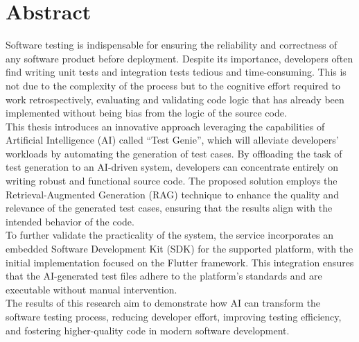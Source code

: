 \documentclass[12pt, twoside]{report}
\begin{document}
\tableofcontents
\listoftables
{}
\listoffigures
{}
\listofalgorithms
{}
\lstlistoflistings
{}

\chapter*{Abstract}
Software testing is indispensable for ensuring the reliability and correctness of any software product before deployment. Despite its importance, developers often find writing unit tests and integration tests tedious and time-consuming. This is not due to the complexity of the process but to the cognitive effort required to work retrospectively, evaluating and validating code logic that has already been implemented without being bias from the logic of the source code. \\
This thesis introduces an innovative approach leveraging the capabilities of Artificial Intelligence (AI) called “Test Genie”, which will alleviate developers' workloads by automating the generation of test cases. By offloading the task of test generation to an AI-driven system, developers can concentrate entirely on writing robust and functional source code. The proposed solution employs the Retrieval-Augmented Generation (RAG) technique to enhance the quality and relevance of the generated test cases, ensuring that the results align with the intended behavior of the code. \\
To further validate the practicality of the system, the service incorporates an embedded Software Development Kit (SDK) for the supported platform, with the initial implementation focused on the Flutter framework. This integration ensures that the AI-generated test files adhere to the platform's standards and are executable without manual intervention. \\
The results of this research aim to demonstrate how AI can transform the software testing process, reducing developer effort, improving testing efficiency, and fostering higher-quality code in modern software development.


\end{document}
